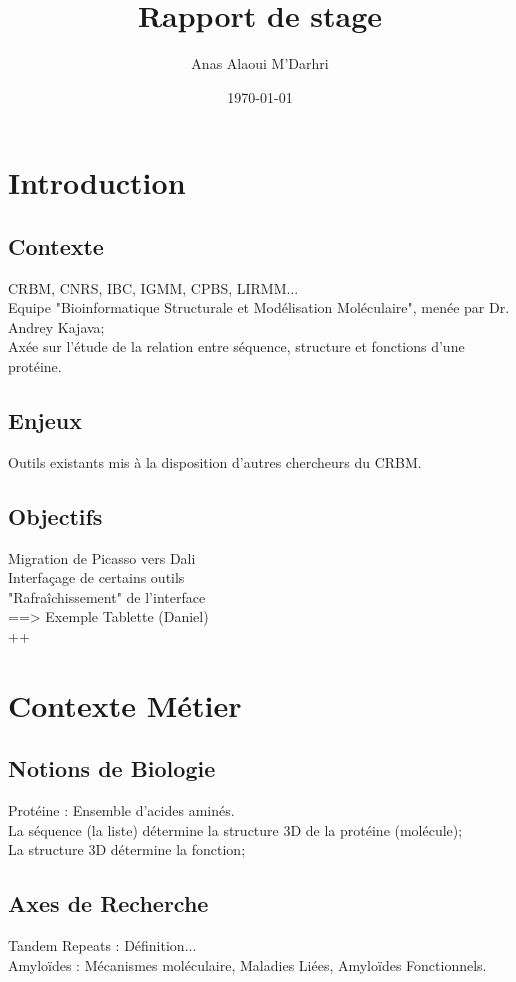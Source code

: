 \documentclass[12pt]{article}
\title{Rapport de stage}
\author{Anas Alaoui M'Darhri
}
\date{\today}
\begin{document}
\maketitle
\newpage
\section*{Introduction}
\subsection*{Contexte}
CRBM, CNRS, IBC, IGMM, CPBS, LIRMM...\\
Equipe "Bioinformatique Structurale et Modélisation Moléculaire", menée par Dr. Andrey Kajava;\\
Axée sur l'étude de la relation entre séquence, structure et fonctions d'une protéine.\\
\subsection*{Enjeux}
Outils existants mis à la disposition d'autres chercheurs du CRBM.
\subsection*{Objectifs}
Migration de Picasso vers Dali\\
Interfaçage de certains outils\\
"Rafraîchissement" de l'interface\\
 ==> Exemple Tablette (Daniel)\\
++\\
\section{Contexte Métier}
\subsection{Notions de Biologie}
Protéine : Ensemble d'acides aminés.\\
La séquence (la liste) détermine la structure 3D de la protéine (molécule); \\
La structure 3D détermine la fonction;\\
\subsection{Axes de Recherche}
Tandem Repeats : Définition...\\
Amyloïdes : Mécanismes moléculaire, Maladies Liées, Amyloïdes Fonctionnels.\\
\end{document}
